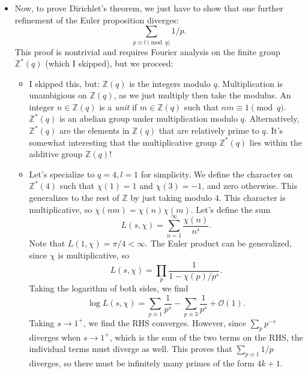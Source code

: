 \documentclass[11pt,
        usenames, %
        dvipsnames %
    ]{report}
\begin{document}
\begin{itemize}
    \item Now, to prove Dirichlet's theorem, we just have to show that one
        further refinement of the Euler proposition diverges:
        \begin{equation}
            \sum\limits_{p \equiv l \pmod q}1/p.
        \end{equation}
        This proof is nontrivial and requires Fourier analysis on the finite
        group $\mathbb{Z}^*(q)$ (which I skipped), but we proceed:
        \begin{itemize}
            \item I skipped this, but: $\mathbb{Z}(q)$ is the integers modulo
                $q$. Multiplication is unambigious on $\mathbb{Z}(q)$, as we
                just multiply then take the modulus. An integer $n \in
                \mathbb{Z}(q)$ is a \emph{unit} if $m \in \mathbb{Z}(q)$ such
                that $nm \equiv 1 \pmod q$. $\mathbb{Z}^*(q)$ is an abelian
                group under multiplication modulo $q$. Alternatively,
                $\mathbb{Z}^*(q)$ are the elements in $\mathbb{Z}(q)$ that are
                relatively prime to $q$. It's somewhat interesting that the
                multiplicative group $\mathbb{Z}^*(q)$ lies within the additive
                group $\mathbb{Z}(q)$!

            \item Let's specialize to $q = 4, l = 1$ for simplicity. We define
                the character on $\mathbb{Z}^*(4)$ such that $\chi(1) = 1$ and
                $\chi(3) = -1$, and zero otherwise. This generalizes to the rest
                of $\mathbb{Z}$ by just taking modulo $4$. This character is
                multiplicative, so $\chi(nm) = \chi(n)\chi(m)$. Let's define the
                sum
                \begin{equation}
                    L(s, \chi) = \sum\limits_{n = 1}^\infty \frac{\chi(n)}{n^s}.
                \end{equation}
                Note that $L(1, \chi) = \pi/4 < \infty$. The Euler product can
                be generalized, since $\chi$ is multiplicative, so
                \begin{equation}
                    L(s, \chi) = \prod_p \frac{1}{1 - \chi(p) / p^s}.
                \end{equation}
                Taking the logarithm of both sides, we find
                \begin{equation}
                    \log L(s, \chi) = \sum\limits_{p \equiv 1}\frac{1}{p^s}
                        - \sum\limits_{p \equiv 3}\frac{1}{p^s}
                        + \mathcal{O}(1).
                \end{equation}
                Taking $s \to 1^+$, we find the RHS converges. However, since
                $\sum\limits_p p^{-s}$ diverges when $s \to 1^+$, which is the
                sum of the two terms on the RHS, the individual terms must
                diverge as well. This proves that $\sum\limits_{p \equiv 1}1/p$
                diverges, so there must be infinitely many primes of the form
                $4k + 1$.


\end{itemize}
\end{itemize}
\end{document}
